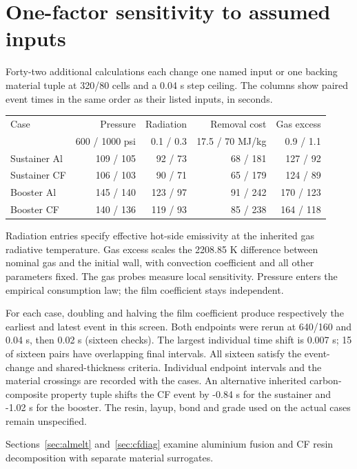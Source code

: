 \clearpage\section{One-factor sensitivity to assumed inputs}
Forty-two additional calculations each change one named input or one backing
material tuple at 320/80 cells and a 0.04 s step ceiling. The columns show
paired event times in the same order as their listed inputs, in seconds.
\begin{table}[H]\centering\begin{tabular}{lrrrr}\toprule
Case & Pressure & Radiation & Removal cost & Gas excess\\
 & 600 / 1000 psi & 0.1 / 0.3 & 17.5 / 70 MJ/kg & 0.9 / 1.1\\\midrule
Sustainer Al & 109 / 105 & 92 / 73 & 68 / 181 & 127 / 92 \\
Sustainer CF & 106 / 103 & 90 / 71 & 65 / 179 & 124 / 89 \\
Booster Al & 145 / 140 & 123 / 97 & 91 / 242 & 170 / 123 \\
Booster CF & 140 / 136 & 119 / 93 & 85 / 238 & 164 / 118 \\
\bottomrule\end{tabular}\end{table}
Radiation entries specify effective hot-side emissivity at the inherited gas
radiative temperature. Gas excess scales the 2208.85 K difference between
nominal gas and the initial wall, with convection coefficient and all other
parameters fixed. The gas probes measure local sensitivity. Pressure enters
the empirical consumption law; the film coefficient stays independent.

For each case, doubling and halving the film coefficient produce respectively
the earliest and latest event in this screen. Both endpoints were rerun at
640/160 and 0.04 s, then 0.02 s (sixteen checks). The largest individual time
shift is 0.007 s; 15 of sixteen pairs have overlapping final
intervals. All sixteen satisfy the event-change and shared-thickness criteria.
Individual endpoint intervals and the material crossings are recorded with
the cases. An alternative inherited carbon-composite property tuple shifts the
CF event by -0.84 s for the sustainer and -1.02 s for the booster. The
resin, layup, bond and grade used on the actual cases remain unspecified.

Sections~\ref{sec:almelt} and~\ref{sec:cfdiag} examine aluminium fusion and
CF resin decomposition with separate material surrogates.
\clearpage
